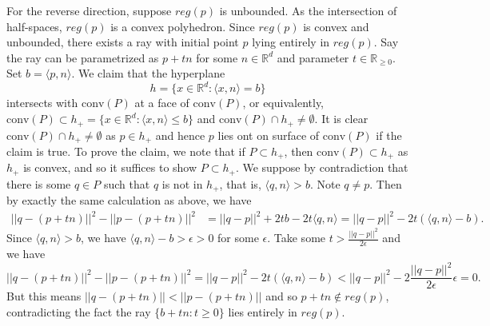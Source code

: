 \documentclass[12pt,reqno]{amsart}
\theoremstyle{definition}
\newcommand{\RR}{\mathbb{R}}
\newcommand{\conv}[1]{\mathrm{conv}(#1)}
\newcommand{\dist}[2]{\mathrm{dist}(#1, #2)}
\newcommand{\inner}[1]{\langle #1 \rangle}
\begin{document}
For the reverse direction, suppose $reg(p)$ is unbounded. As the intersection of half-spaces, $reg(p)$ is a convex polyhedron. Since $reg(p)$ is convex and unbounded, there exists a ray with initial point $p$ lying entirely in $reg(p)$. Say the ray can be parametrized as $p+tn$ for some $n\in \RR^d$ and parameter $t\in \RR_{\geq 0}$. Set $b= \inner{p,n}$. We claim that the hyperplane $$h=\{x\in \RR^d: \inner{x, n} = b \}$$ intersects with $\conv{P}$  at a face of  $\conv{P}$, or equivalently, $\conv{P}\subset h_+ =\{x\in \RR^d: \inner{x, n} \leq b \}$ and $\conv{P} \cap h_+ \not= \emptyset$. It is clear $\conv{P} \cap h_+ \not= \emptyset$ as $p\in h_+$ and hence $p$ lies ont on surface of  $\conv{P}$ if the claim is true. To prove the claim, we note that if $P\subset h_+$, then $\conv{P}\subset h_+$ as $h_+$ is convex, and so it suffices to show $P\subset h_+$. We suppose by contradiction that there is some $q\in P$ such that $q$ is not in $h_+$, that is, $\inner{q,n}>b$. Note $q\not= p$. Then by exactly the same calculation as above, we have
\begin{align*}
  ||q-(p+tn)||^2  - ||p-(p+tn)||^2 & = ||q-p||^2 + 2tb - 2t\inner{q,n} =  ||q-p||^2 - 2t( \inner{q,n} -b).
\end{align*}
Since $\inner{q,n}>b$, we have $\inner{q,n} -b >\epsilon >0$ for some $\epsilon$. Take some $t> \frac{||q-p||^2}{ 2\epsilon}$ and we have
$$ ||q-(p+tn)||^2  - ||p-(p+tn)||^2  = ||q-p||^2 - 2t( \inner{q,n} -b)  < ||q-p||^2 - 2 \frac{||q-p||^2}{ 2\epsilon}\epsilon=0.$$
But this means $||q-(p+tn)|| < ||p-(p+tn)||$ and so $p+tn\notin reg(p)$, contradicting the fact  the ray $\{b+tn: t\geq 0\}$ lies entirely in $reg(p)$.

\end{document}
